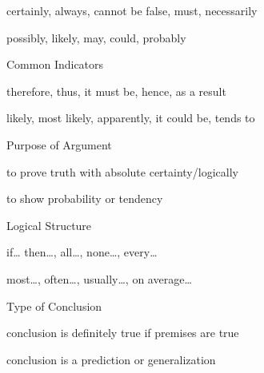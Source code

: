 certainly, always, cannot be false, must, necessarily

possibly, likely, may, could, probably

Common Indicators

therefore, thus, it must be, hence, as a result

likely, most likely, apparently, it could be, tends to

Purpose of Argument

to prove truth with absolute certainty/logically

to show probability or tendency

Logical Structure

if\ldots{} then\ldots, all\ldots, none\ldots, every\ldots{}

most\ldots, often\ldots, usually\ldots, on average\ldots{}

Type of Conclusion

conclusion is definitely true if premises are true

conclusion is a prediction or generalization

